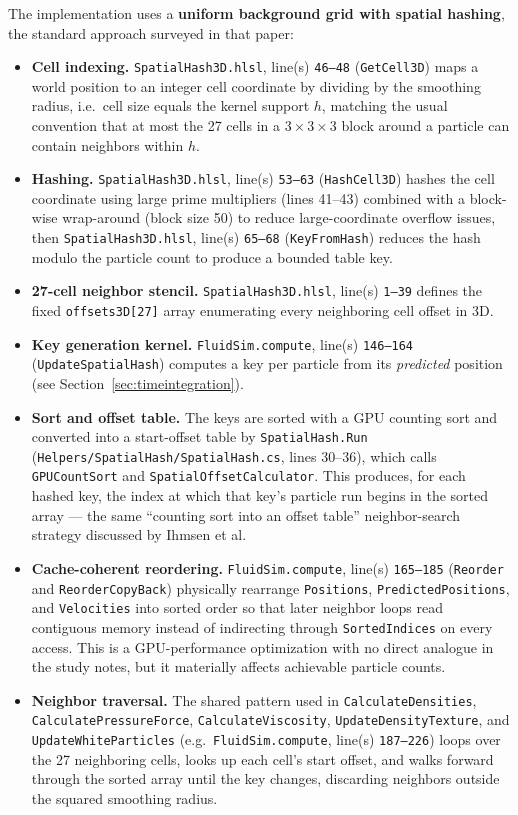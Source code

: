 \documentclass[11pt]{article}
\newcommand{\file}[1]{\texttt{#1}}
\newcommand{\loc}[2]{\texttt{#1}, line(s) \texttt{#2}}
\begin{document}
The implementation uses a \textbf{uniform background grid with spatial
hashing}, the standard approach surveyed in that paper:

\begin{itemize}
    \item \textbf{Cell indexing.} \loc{SpatialHash3D.hlsl}{46--48}
    (\texttt{GetCell3D}) maps a world position to an integer cell coordinate
    by dividing by the smoothing radius, i.e.\ cell size equals the kernel
    support $h$, matching the usual convention that at most the 27 cells in a
    $3\times3\times3$ block around a particle can contain neighbors within
    $h$.
    \item \textbf{Hashing.} \loc{SpatialHash3D.hlsl}{53--63}
    (\texttt{HashCell3D}) hashes the cell coordinate using large prime
    multipliers (lines 41--43) combined with a block-wise wrap-around
    (block size 50) to reduce large-coordinate overflow issues, then
    \loc{SpatialHash3D.hlsl}{65--68} (\texttt{KeyFromHash}) reduces the hash
    modulo the particle count to produce a bounded table key.
    \item \textbf{27-cell neighbor stencil.} \loc{SpatialHash3D.hlsl}{1--39}
    defines the fixed \texttt{offsets3D[27]} array enumerating every
    neighboring cell offset in 3D.
    \item \textbf{Key generation kernel.} \loc{FluidSim.compute}{146--164}
    (\texttt{UpdateSpatialHash}) computes a key per particle from its
    \emph{predicted} position (see Section~\ref{sec:timeintegration}).
    \item \textbf{Sort and offset table.} The keys are sorted with a GPU
    counting sort and converted into a start-offset table by
    \texttt{SpatialHash.Run} (\file{Helpers/SpatialHash/SpatialHash.cs},
    lines 30--36), which calls \texttt{GPUCountSort} and
    \texttt{SpatialOffsetCalculator}. This produces, for each hashed key, the
    index at which that key's particle run begins in the sorted array ---
    the same ``counting sort into an offset table'' neighbor-search strategy
    discussed by Ihmsen et al.
    \item \textbf{Cache-coherent reordering.} \loc{FluidSim.compute}{165--185}
    (\texttt{Reorder} and \texttt{ReorderCopyBack}) physically rearrange
    \texttt{Positions}, \texttt{PredictedPositions}, and \texttt{Velocities}
    into sorted order so that later neighbor loops read contiguous memory
    instead of indirecting through \texttt{SortedIndices} on every access.
    This is a GPU-performance optimization with no direct analogue in the
    study notes, but it materially affects achievable particle counts.
    \item \textbf{Neighbor traversal.} The shared pattern used in
    \texttt{CalculateDensities}, \texttt{CalculatePressureForce},
    \texttt{CalculateViscosity}, \texttt{UpdateDensityTexture}, and
    \texttt{UpdateWhiteParticles} (e.g.\ \loc{FluidSim.compute}{187--226})
    loops over the 27 neighboring cells, looks up each cell's start offset,
    and walks forward through the sorted array until the key changes,
    discarding neighbors outside the squared smoothing radius.
\end{itemize}
\end{document}
